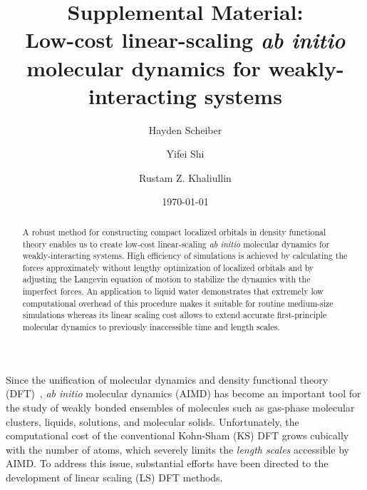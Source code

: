 \documentclass[aps,prl,reprint,amsmath,amssymb]{revtex4-1}
\newcommand*{\MAINTEXT}{}
\begin{document}
\ifdefined\MAINTEXT
\else
	\clearpage
	\widetext
	\setcounter{figure}{0}
	\setcounter{page}{1}
	\renewcommand{\thefigure}{S\arabic{figure}}
\fi

\title{
\ifdefined\MAINTEXT
\else
Supplemental Material: \\
\fi
Low-cost linear-scaling \emph{ab initio} molecular dynamics for weakly-interacting systems
}

\author{Hayden Scheiber}
\author{Yifei Shi}
\author{Rustam Z. Khaliullin}

\date{\today}

\ifdefined\MAINTEXT

\begin{abstract} 
A robust method for constructing compact localized orbitals in density functional theory enables us to create low-cost linear-scaling \emph{ab initio} molecular dynamics for weakly-interacting systems. High efficiency of simulations is achieved by calculating the forces approximately without lengthy optimization of localized orbitals and by adjusting the Langevin equation of motion to stabilize the dynamics with the imperfect forces. An application to liquid water demonstrates that extremely low computational overhead of this procedure makes it suitable for routine medium-size simulations whereas its linear scaling cost allows to extend accurate first-principle molecular dynamics to previously inaccessible time and length scales. 
\end{abstract}

\fi

\maketitle

\ifdefined\MAINTEXT


Since the unification of molecular dynamics and density functional theory (DFT)~\cite{a:thecpmd},
\emph{ab initio} molecular dynamics (AIMD) has become an important tool for the study of weakly bonded ensembles of molecules such as gas-phase molecular clusters, liquids, solutions, and molecular solids. %
Unfortunately, the computational cost of the conventional Kohn-Sham (KS) DFT grows cubically with the number of atoms, which severely limits the \emph{length scales} accessible by AIMD. %
To address this issue, substantial efforts have been directed to the development of linear scaling (LS) DFT methods.
\end{document}
